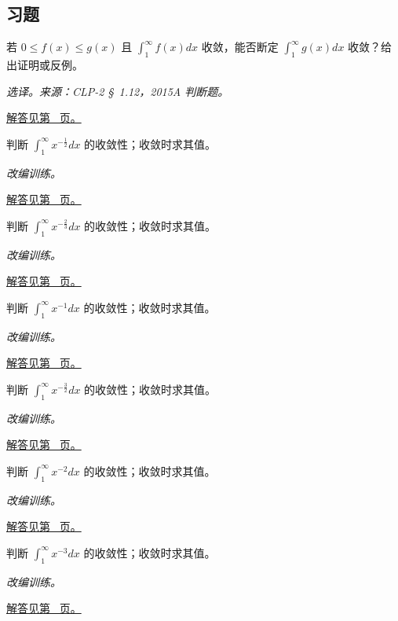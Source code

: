 \documentclass[UTF8,12pt,a4paper,fontset=fandol]{ctexart}
\begin{document}
\subsection{习题}
\begin{example}[比较判别的方向]\label{ex:c19q1}
若 $0\le f(x)\le g(x)$ 且 $\int_1^\infty f(x)dx$ 收敛，能否断定 $\int_1^\infty g(x)dx$ 收敛？给出证明或反例。
\par\textit{选译。来源：CLP-2 \S~1.12，2015A 判断题。}\par\hyperref[ans:c19q1]{解答见第~\pageref{ans:c19q1} 页。}
\end{example}
\begin{example}[无穷区间上的幂函数]\label{ex:c19q2}
判断 $\displaystyle\int_1^\infty x^{-\frac{1}{2}}dx$ 的收敛性；收敛时求其值。
\par\textit{改编训练。}\par\hyperref[ans:c19q2]{解答见第~\pageref{ans:c19q2} 页。}
\end{example}
\begin{example}[无穷区间上的幂函数]\label{ex:c19q3}
判断 $\displaystyle\int_1^\infty x^{-\frac{2}{3}}dx$ 的收敛性；收敛时求其值。
\par\textit{改编训练。}\par\hyperref[ans:c19q3]{解答见第~\pageref{ans:c19q3} 页。}
\end{example}
\begin{example}[无穷区间上的幂函数]\label{ex:c19q4}
判断 $\displaystyle\int_1^\infty x^{-1}dx$ 的收敛性；收敛时求其值。
\par\textit{改编训练。}\par\hyperref[ans:c19q4]{解答见第~\pageref{ans:c19q4} 页。}
\end{example}
\begin{example}[无穷区间上的幂函数]\label{ex:c19q5}
判断 $\displaystyle\int_1^\infty x^{-\frac{3}{2}}dx$ 的收敛性；收敛时求其值。
\par\textit{改编训练。}\par\hyperref[ans:c19q5]{解答见第~\pageref{ans:c19q5} 页。}
\end{example}
\begin{example}[无穷区间上的幂函数]\label{ex:c19q6}
判断 $\displaystyle\int_1^\infty x^{-2}dx$ 的收敛性；收敛时求其值。
\par\textit{改编训练。}\par\hyperref[ans:c19q6]{解答见第~\pageref{ans:c19q6} 页。}
\end{example}
\begin{example}[无穷区间上的幂函数]\label{ex:c19q7}
判断 $\displaystyle\int_1^\infty x^{-3}dx$ 的收敛性；收敛时求其值。
\par\textit{改编训练。}\par\hyperref[ans:c19q7]{解答见第~\pageref{ans:c19q7} 页。}
\end{example}
\end{document}
